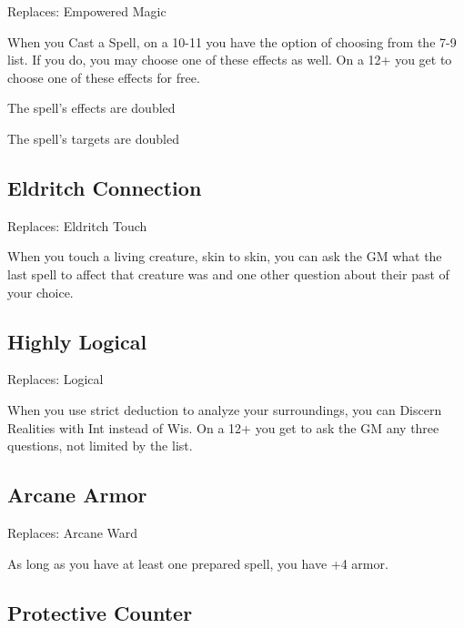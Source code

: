 Replaces: Empowered Magic

         

When you Cast a Spell, on a 10-11 you have the option of choosing from the 7-9 list. If you do, you may choose one of these effects as well. On a 12+ you get to choose one of these effects for free.

         
\startitemize[1,packed]
           
\item The spell’s effects are doubled

           
\item The spell’s targets are doubled

         
\stopitemize
         
\subsection{Eldritch Connection}    
         

Replaces: Eldritch Touch

         

When you touch a living creature, skin to skin, you can ask the GM what the last spell to affect that creature was and one other question about their past of your choice.

         
\subsection{Highly Logical}    
         

Replaces: Logical

         

When you use strict deduction to analyze your surroundings, you can Discern Realities with Int instead of Wis. On a 12+ you get to ask the GM any three questions, not limited by the list.

         
\subsection{Arcane Armor}    
         

Replaces: Arcane Ward

         

As long as you have at least one prepared spell, you have +4 armor.

         
\subsection{Protective Counter}    
         

